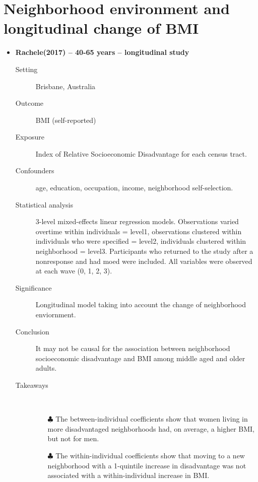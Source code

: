 \documentclass{article}
\begin{document}
\section{Neighborhood environment and longitudinal change of BMI}
\begin{itemize}
	\item{\bf Rachele(2017) -- 40-65 years -- longitudinal study} 
	
		\begin{description}
			\item[Setting] Brisbane, Australia
			\item[Outcome] BMI (self-reported)
			\item[Exposure] Index of Relative Socioeconomic Disadvantage for each census tract.
			\item[Confounders] age, education, occupation, income, neighborhood self-selection.
			\item[Statistical analysis] 3-level mixed-effects linear regression models. Observations varied overtime within individuals = level1, observations clustered within individuals who were specified = level2, individuals clustered within neighborhood = level3. Participants who returned to the study after a nonresponse and had moed were included. All variables were  observed at each wave (0, 1, 2, 3).
			\item[Significance] Longitudinal model taking into account the change of neighborhood enviornment.
			\item[Conclusion] It may not be causal for the association between neighborhood socioeconomic disadvantage and BMI among middle aged and older adults.
			\item[Takeaways] \mbox{}\\
				\begin{itemize}
					\item[$\clubsuit$] The between-individual coefficients show that women living in more disadvantaged neighborhoods had, on average, a higher BMI, but not for men. 
					\item[$\clubsuit$] The within-individual coefficients show that moving to a new neighborhood with a 1-quintile increase in disadvantage was not associated with a within-individual increase in BMI.
				\end{itemize}
		\end{description}
\end{itemize}
\end{document}
